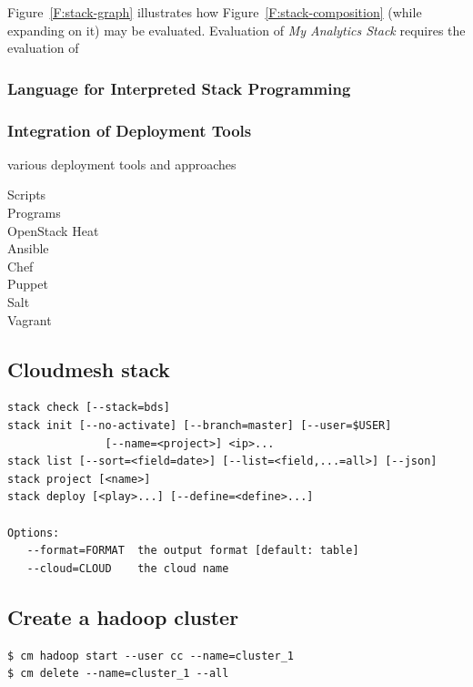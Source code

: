 Figure~\ref{F:stack-graph} illustrates how Figure~\ref{F:stack-composition} (while expanding on it) may be evaluated.
Evaluation of \emph{My Analytics Stack} requires the evaluation of {

\subsubsection{Language for Interpreted Stack Programming} \label{S:stack-lisp}


\subsubsection{Integration of Deployment Tools}

various deployment tools and approaches

\begin{description}
\item[Scripts]
\item[Programs]
\item[OpenStack Heat]
\item[Ansible]
\item[Chef]
\item[Puppet]
\item[Salt]
\item[Vagrant]
\end{description}

\subsection{Cloudmesh stack}

\begin{Verbatim}[fontfamily=helvetica]
stack check [--stack=bds]
stack init [--no-activate] [--branch=master] [--user=$USER] 
               [--name=<project>] <ip>...
stack list [--sort=<field=date>] [--list=<field,...=all>] [--json]
stack project [<name>]
stack deploy [<play>...] [--define=<define>...]

Options:
   --format=FORMAT  the output format [default: table]
   --cloud=CLOUD    the cloud name
\end{Verbatim}

\subsection{Create a hadoop cluster}

\begin{Verbatim}[fontfamily=helvetica]
$ cm hadoop start --user cc --name=cluster_1
$ cm delete --name=cluster_1 --all  
\end{Verbatim}


}
